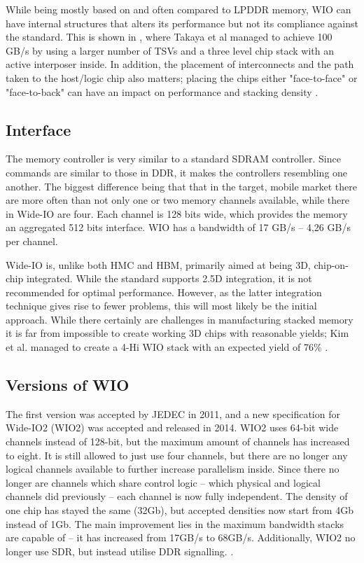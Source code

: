 While being mostly based on and often compared to LPDDR memory, WIO can have internal structures that alters its performance but not its compliance against the standard. This is shown in \cite{6487803}, where Takaya et al managed to achieve 100 GB/s by using a larger number of TSVs and a three level chip stack with an active interposer inside. In addition, the placement of interconnects and the path taken to the host/logic chip also matters; placing the chips either "face-to-face" or "face-to-back" can have an impact on performance and stacking density \cite{6248798}.

\subsection{Interface}
The memory controller is very similar to a standard SDRAM controller. Since commands are similar to those in DDR, it makes the controllers resembling one another. The biggest difference being that that in the target, mobile market there are more often than not only one or two memory channels available, while there in Wide-IO are four. Each channel is 128 bits wide, which provides the memory an aggregated 512 bits interface. WIO has a bandwidth of 17 GB/s -- 4,26 GB/s per channel.
\bigskip

Wide-IO is, unlike both HMC and HBM, primarily aimed at being 3D, chip-on-chip integrated. While the standard supports 2.5D integration, it is not recommended for optimal performance. However, as the latter integration technique gives rise to fewer problems, this will most likely be the initial approach. While there certainly are challenges in manufacturing stacked memory it is far from impossible to create working 3D chips with reasonable yields; Kim et al. managed to create a 4-Hi WIO stack with an expected yield of 76\% \cite{kim20121}.

\subsection{Versions of WIO}
The first version was accepted by JEDEC in 2011, and a new specification for Wide-IO2 (WIO2) was accepted and released in 2014. WIO2 uses 64-bit wide channels instead of 128-bit, but the maximum amount of channels has increased to eight. It is still allowed to just use four channels, but there are no longer any logical channels available to further increase parallelism inside. Since there no longer are channels which share control logic -- which physical and logical channels did previously -- each channel is now fully independent. The density of one chip has stayed the same (32Gb), but accepted densities now start from 4Gb instead of 1Gb. The main improvement lies in the maximum bandwidth stacks are capable of -- it has increased from 17GB/s to 68GB/s. Additionally, WIO2 no longer use SDR, but instead utilise DDR signalling. \cite{standard2014wide}.

